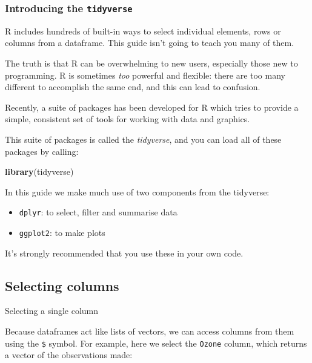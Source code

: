 \documentclass[]{article}
\newenvironment{Shaded}{\begin{snugshade}}{\end{snugshade}}
\newcommand{\KeywordTok}[1]{\textcolor[rgb]{0.13,0.29,0.53}{\textbf{#1}}}
\newcommand{\NormalTok}[1]{#1}
\providecommand{\tightlist}{%
  \setlength{\itemsep}{0pt}\setlength{\parskip}{0pt}}
\theoremstyle{definition}
\theoremstyle{definition}
\theoremstyle{definition}
\theoremstyle{remark}
\begin{document}
\subsubsection*{\texorpdfstring{Introducing the
\texttt{tidyverse}}{Introducing the tidyverse}}\label{tidyverse}

R includes hundreds of built-in ways to select individual elements, rows
or columns from a dataframe. This guide isn't going to teach you many of
them.

The truth is that R can be overwhelming to new users, especially those
new to programming. R is sometimes \emph{too} powerful and flexible:
there are too many different to accomplish the same end, and this can
lead to confusion.

Recently, a suite of packages has been developed for R which tries to
provide a simple, consistent set of tools for working with data and
graphics.

This suite of packages is called the \emph{tidyverse}, and you can load
all of these packages by calling:

\begin{Shaded}
\begin{Highlighting}[]
\KeywordTok{library}\NormalTok{(tidyverse)}
\end{Highlighting}
\end{Shaded}

In this guide we make much use of two components from the tidyverse:

\begin{itemize}
\tightlist
\item
  \texttt{dplyr}: to select, filter and summarise data
\item
  \texttt{ggplot2}: to make plots
\end{itemize}

It's strongly recommended that you use these in your own code.

\subsection*{Selecting columns}\label{selecting-columns}

Selecting a single column

Because dataframes act like lists of vectors, we can access columns from
them using the \texttt{\$} symbol. For example, here we select the
\texttt{Ozone} column, which returns a vector of the observations made:
\end{document}

